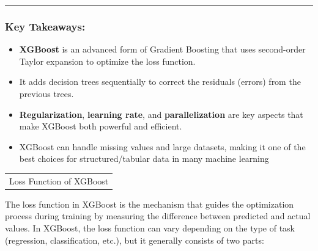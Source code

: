 \documentclass[12pt]{book}
\providecommand{\tightlist}{%
  \setlength{\itemsep}{0pt}\setlength{\parskip}{0pt}}
\begin{document}
\begin{center}\rule{0.5\linewidth}{0.5pt}\end{center}

\subsubsection{Key Takeaways:}\label{key-takeaways-1}

\begin{itemize}
\tightlist
\item
  \textbf{XGBoost} is an advanced form of Gradient Boosting that uses
  second-order Taylor expansion to optimize the loss function.
\item
  It adds decision trees sequentially to correct the residuals (errors)
  from the previous trees.
\item
  \textbf{Regularization}, \textbf{learning rate}, and
  \textbf{parallelization} are key aspects that make XGBoost both
  powerful and efficient.
\item
  XGBoost can handle missing values and large datasets, making it one of
  the best choices for structured/tabular data in many machine learning
\end{itemize}

\begin{longtable}[]{@{}l@{}}
\toprule\noalign{}
\endhead
\bottomrule\noalign{}
\endlastfoot
Loss Function of XGBoost \\
\end{longtable}

The loss function in XGBoost is the mechanism that guides the
optimization process during training by measuring the difference between
predicted and actual values. In XGBoost, the loss function can vary
depending on the type of task (regression, classification, etc.), but it
generally consists of two parts:
\end{document}
